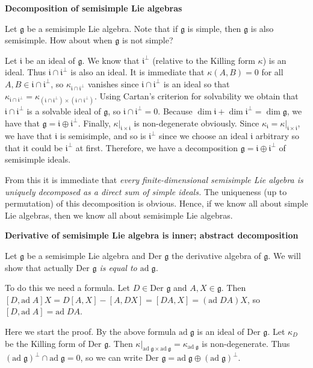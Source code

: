 \documentclass{article}
\newcommand{\lie}[1]{\mathfrak{#1}}
\newcommand{\ad}[1]{\mathrm{ad}\; #1}
\begin{document}
\textbf{Decomposition of semisimple Lie algebras}

Let $\lie{g}$ be a semisimple Lie algebra.
Note that if $\lie{g}$ is simple, then $\lie{g}$ is also semisimple.
How about when $\lie{g}$ is not simple?

Let $\lie{i}$ be an ideal of $\lie{g}$.
We know that $\lie{i}^\perp$ (relative to the Killing form $\kappa$) is an ideal.
Thus $\lie{i} \cap \lie{i}^\perp$ is also an ideal.
It is immediate that $\kappa(A, B) = 0$ for all $A, B \in \lie{i} \cap \lie{i}^\perp$, so $\kappa_{\lie{i} \cap \lie{i}^\perp}$ vanishes since $\lie{i} \cap \lie{i}^\perp$ is an ideal so that $\kappa_{\lie{i} \cap \lie{i}^\perp} = \kappa_{(\lie{i} \cap \lie{i}^\perp) \times (\lie{i} \cap \lie{i}^\perp)}$.
Using Cartan's criterion for solvability we obtain that $\lie{i} \cap \lie{i}^\perp$ is a solvable ideal of $\lie{g}$, so $\lie{i} \cap \lie{i}^\perp = 0$.
Because $\dim{\lie{i}} + \dim{\lie{i}^\perp} = \dim{\lie{g}}$, we have that $\lie{g} = \lie{i} \oplus \lie{i}^\perp$.
Finally, $\kappa|_{\lie{i} \times \lie{i}}$ is non-degenerate obviously.
Since $\kappa_\lie{i} = \kappa|_{\lie{i} \times \lie{i}}$, we have that $\lie{i}$ is semisimple, and so is $\lie{i}^\perp$ since we choose an ideal $\lie{i}$ arbitrary so that it could be $\lie{i}^\perp$ at first.
Therefore, we have a decomposition $\lie{g} = \lie{i} \oplus \lie{i}^\perp$ of semisimple ideals.

From this it is immediate that \textit{every finite-dimensional semisimple Lie algebra is uniquely decomposed as a direct sum of simple ideals.}
The uniqueness (up to permutation) of this decomposition is obvious.
Hence, if we know all about simple Lie algebras, then we know all about semisimple Lie algebras.

\newpage

\textbf{Derivative of semisimple Lie algebra is inner; abstract decomposition}

Let $\lie{g}$ be a semisimple Lie algebra and $\textrm{Der }\lie{g}$ the derivative algebra of $\lie{g}$.
We will show that actually \textit{$\textrm{Der }\lie{g}$ is equal to $\ad{\lie{g}}$.}

To do this we need a formula.
Let $D \in \textrm{Der }\lie{g}$ and $A, X \in \lie{g}$.
Then $[D, \ad{A}]X = D[A, X] - [A, DX] = [DA, X] = (\ad{DA})X$, so $[D, \ad{A}] = \ad{DA}$.

Here we start the proof.
By the above formula $\ad{\lie{g}}$ is an ideal of $\textrm{Der }\lie{g}$.
Let $\kappa_D$ be the Killing form of $\textrm{Der }\lie{g}$.
Then $\kappa|_{\ad{\lie{g}} \times \ad{\lie{g}}} = \kappa_{\ad{\lie{g}}}$ is non-degenerate.
Thus $(\ad{\lie{g}})^\perp \cap \ad{\lie{g}} = 0$, so we can write $\textrm{Der }\lie{g} = \ad{\lie{g}} \oplus (\ad{\lie{g}})^\perp$.
\end{document}
